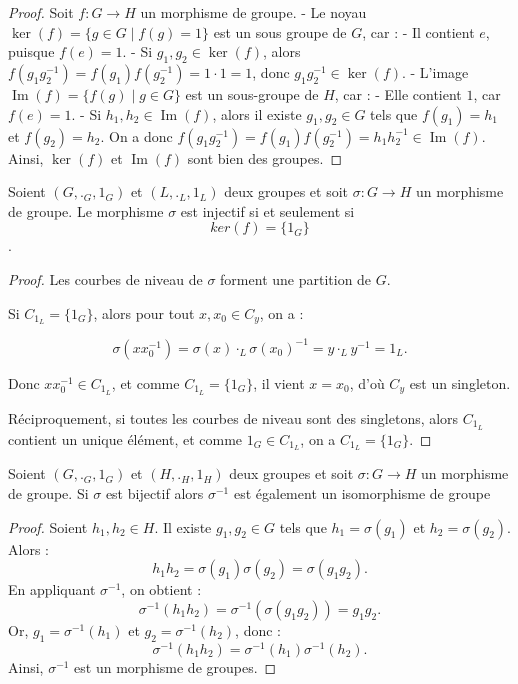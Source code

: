 \begin{proof}
    Soit \( f : G \to H \) un morphisme de groupe.
- Le noyau \( \ker(f) = \{ g \in G \mid f(g) = 1 \} \) est un sous groupe de \( G \), car :
  - Il contient \( e \), puisque \( f(e) = 1 \).
  - Si \( g_1, g_2 \in \ker(f) \), alors \( f(g_1 g_2^{-1}) = f(g_1) f(g_2^{-1}) = 1\cdot1 = 1 \), donc \( g_1 g_2^{-1} \in \ker(f) \).
- L'image \( \operatorname{Im}(f) = \{ f(g) \mid g \in G \} \) est un sous-groupe de \( H \), car :
  - Elle contient \( 1 \), car \( f(e) = 1 \).
  - Si \( h_1, h_2 \in \operatorname{Im}(f) \), alors il existe \( g_1, g_2 \in G \) tels que \( f(g_1) = h_1 \) et \( f(g_2) = h_2 \). On a donc \( f(g_1 g_2^{-1}) = f(g_1) f(g_2^{-1}) = h_1 h_2^{-1} \in \operatorname{Im}(f) \).
Ainsi, \( \ker(f) \) et \( \operatorname{Im}(f) \) sont bien des groupes.
\end{proof}

\begin{proposition}
    Soient $(G,._G,1_G)$ et $(L,._L,1_L)$ deux groupes et soit $\sigma:G\to H$ un morphisme de groupe. Le morphisme $\sigma$ est injectif si et seulement si
    \[
    ker(f) = \{1_G\}
    \].
\end{proposition}

\begin{proof}
    Les courbes de niveau de \( \sigma \) forment une partition de \( G \).

Si \( C_{1_L} = \{1_G\} \), alors pour tout \( x, x_0 \in C_y \), on a :

\[
\sigma(x x_0^{-1}) = \sigma(x) \cdot_L \sigma(x_0)^{-1} = y \cdot_L y^{-1} = 1_L.
\]

Donc \( x x_0^{-1} \in C_{1_L} \), et comme \( C_{1_L} = \{1_G\} \), il vient \( x = x_0 \), d’où \( C_y \) est un singleton.

Réciproquement, si toutes les courbes de niveau sont des singletons, alors \( C_{1_L} \) contient un unique élément, et comme \( 1_G \in C_{1_L} \), on a \( C_{1_L} = \{1_G\} \).
\end{proof}

\begin{proposition}
     Soient $(G,._G,1_G)$ et $(H,._H,1_H)$ deux groupes et soit $\sigma:G\to H$ un morphisme de groupe. Si $\sigma$ est bijectif alors $\sigma^{-1}$ est également un isomorphisme de groupe
\end{proposition}

\begin{proof}
Soient \( h_1, h_2 \in H \). Il existe \( g_1, g_2 \in G \) tels que \( h_1 = \sigma(g_1) \) et \( h_2 = \sigma(g_2) \). Alors :
\[
h_1 h_2 = \sigma(g_1) \sigma(g_2) = \sigma(g_1 g_2).
\]
En appliquant \( \sigma^{-1} \), on obtient :
\[
\sigma^{-1}(h_1 h_2) = \sigma^{-1}(\sigma(g_1 g_2)) = g_1 g_2.
\]
Or, \( g_1 = \sigma^{-1}(h_1) \) et \( g_2 = \sigma^{-1}(h_2) \), donc :
\[
\sigma^{-1}(h_1 h_2) = \sigma^{-1}(h_1) \sigma^{-1}(h_2).
\]
Ainsi, \( \sigma^{-1} \) est un morphisme de groupes.
\end{proof}

